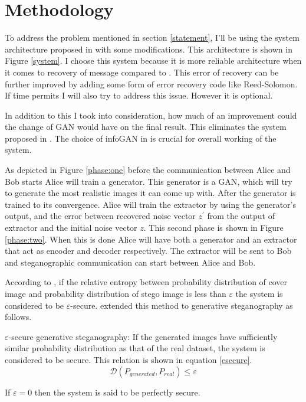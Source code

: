 \documentclass[../main/main.tex]{subfiles}
\begin{document}
	
	\section{ Methodology}
	To address the problem mentioned in section \ref{statement}, I'll be using the system architecture proposed in  with some modifications. This architecture is shown in Figure \ref{system}. I choose this system because it is more reliable architecture when it comes to recovery of message  compared to . This error of recovery can be further improved by adding some form of error recovery code like Reed-Solomon. If time permits I will also try to address this issue. However it is optional. 
	
	In addition to this I took into consideration, how much of an improvement could the change of \gls{GAN} would have on the final result. This eliminates the system proposed in . The choice of \gls{infoGAN} in  is crucial for overall working of the system. 
	
	As depicted in Figure \ref{phase:one} before the communication between Alice and Bob starts Alice will train a generator. This generator is a \gls{GAN}, which will try to generate the most realistic images it can come up with.
	After the generator is trained to its convergence. Alice will train the extractor by using the generator's output, and the error between recovered noise vector $z^\prime$ from the output of extractor and the initial noise vector $z$. This second phase is shown in Figure \ref{phase:two}. When this is done Alice will have both a generator and an extractor that act as  encoder and  decoder respectively. The extractor will be sent to Bob and steganographic communication can start between Alice and Bob.
	
	According to ,  if the relative entropy between  probability distribution of  cover image and probability distribution of stego image is less than $\varepsilon$ the system is considered to be $\varepsilon$-secure.  extended this method to generative steganography as follows. 
		
	\theoremstyle{definition}
	\begin{definition}{$\varepsilon$-secure generative steganography: }
		If the generated images have sufficiently similar probability distribution as that of the real dataset,  the system is considered to be secure. This relation is shown in equation \ref{esecure}.
		\begin{equation} \label{esecure}
		\mathcal{D}(P_{generated},P_{real}) \leq \varepsilon
		\end{equation}
		
		If $\varepsilon=0$ then the system is said to be perfectly secure. 
	\end{definition}
\end{document}
